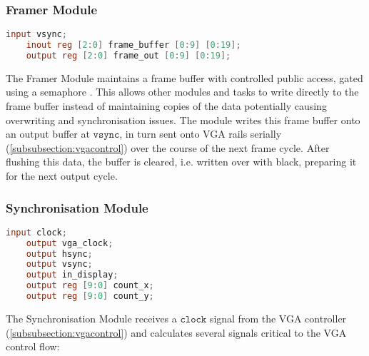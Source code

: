 \subsubsection{Framer Module}
\label{subsubsection:framer}
%
\begin{lstlisting}[language=Verilog]
    input vsync;
    inout reg [2:0] frame_buffer [0:9] [0:19];
    output reg [2:0] frame_out [0:9] [0:19];
\end{lstlisting}

The Framer Module maintains a frame buffer with controlled public access,
gated using a semaphore \cite{semaphore}. This allows other modules and tasks 
to write directly to the frame buffer instead of maintaining copies of the data 
potentially causing overwriting and synchronisation issues. The module writes this
frame buffer onto an output buffer at \(\texttt{vsync}\), 
in turn sent onto VGA rails serially (\ref{subsubsection:vgacontrol})
over the course of the next frame cycle. After flushing this data, the buffer is cleared,
i.e. written over with black, preparing it for the next output cycle.

\subsubsection{Synchronisation Module}
\label{subsubsection:vgasync}
%
\begin{lstlisting}[language=Verilog]
    input clock;
    output vga_clock;
    output hsync;              
    output vsync;               
    output in_display;          
    output reg [9:0] count_x;
    output reg [9:0] count_y;
\end{lstlisting}

The Synchronisation Module receives a \(\texttt{clock}\) signal from
the VGA controller (\ref{subsubsection:vgacontrol}) and calculates several
signals critical to the VGA control flow:

